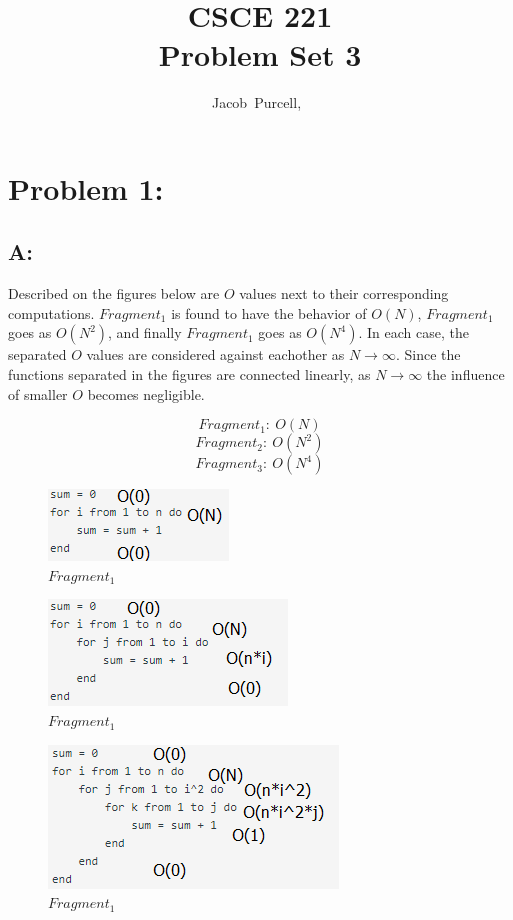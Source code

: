 \documentclass[journal]{IEEEtran}
\begin{document}
\title{CSCE 221 \\ Problem Set 3}

\author{Jacob~Purcell,~}

\maketitle
\section{Problem 1:}
\subsection*{A:}

Described on the figures below are $O$ values next to their corresponding computations.
$Fragment_1$ is found to have the behavior of $O(N)$, $Fragment_1$ goes as $O(N^2)$, and finally 
$Fragment_1$ goes as $O(N^4)$. In each case, the separated $O$ values are considered against 
eachother as $N \rightarrow \infty$. Since the functions separated in the figures are 
connected linearly, as $N \rightarrow \infty$ the influence of smaller $O$ becomes 
negligible. 

$$ Fragment_1:~\boxed{O(N)} $$
$$ Fragment_2:~\boxed{O(N^2)} $$
$$ Fragment_3:~\boxed{O(N^4)} $$

\begin{figure}[h!]
	\includegraphics[scale = 1]{F1.PNG}
	\caption{$Fragment_1$}
\end{figure}

\begin{figure}[h!]
	\includegraphics[scale = 1]{F2.PNG}
	\caption{$Fragment_1$}
\end{figure}

\begin{figure}[h!]
	\includegraphics[scale = 1]{F3.PNG}
	\caption{$Fragment_1$}
\end{figure}
\end{document}
